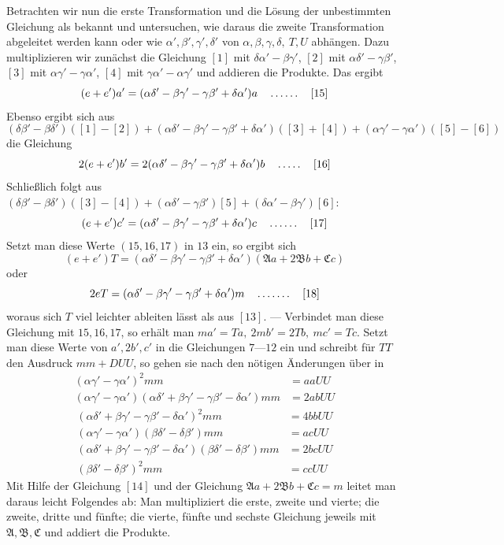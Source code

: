 Betrachten wir nun die erste Transformation und die Lösung der unbestimmten Gleichung als bekannt und untersuchen, wie daraus die zweite Transformation abgeleitet werden kann oder wie $\alpha',\beta',\gamma',\delta'$ von $\alpha,\beta,\gamma,\delta,\ T,U$ abhängen. Dazu multiplizieren wir zunächst die Gleichung $[1]$ mit $\delta\alpha'-\beta\gamma'$, $[2]$ mit $\alpha\delta'-\gamma\beta'$, $[3]$ mit $\alpha\gamma'-\gamma\alpha'$, $[4]$ mit $\gamma\alpha'-\alpha\gamma'$ und addieren die Produkte. Das ergibt
\[
(e+e')a'=(\alpha\delta'-\beta\gamma'-\gamma\beta'+\delta\alpha')a\quad\mathinner{.\,.\,.\,.\,.\,.}\quad[15]
\]
Ebenso ergibt sich aus
\[
(\delta\beta'-\beta\delta')([1]-[2])+(\alpha\delta'-\beta\gamma'-\gamma\beta'+\delta\alpha')([3]+[4])+(\alpha\gamma'-\gamma\alpha')([5]-[6])
\]
die Gleichung
\[
2(e+e')b'=2(\alpha\delta'-\beta\gamma'-\gamma\beta'+\delta\alpha')b\quad\mathinner{.\,.\,.\,.\,.}\quad[16]
\]
Schließlich folgt aus $(\delta\beta'-\beta\delta')([3]-[4])+(\alpha\delta'-\gamma\beta')[5]+(\delta\alpha'-\beta\gamma')[6]$:
\[
(e+e')c'=(\alpha\delta'-\beta\gamma'-\gamma\beta'+\delta\alpha')c\quad\mathinner{.\,.\,.\,.\,.\,.}\quad[17]
\]
Setzt man diese Werte $(15,16,17)$ in $13$ ein, so ergibt sich
\[
(e+e')T=(\alpha\delta'-\beta\gamma'-\gamma\beta'+\delta\alpha')(\mathfrak{A}a+2\mathfrak{B}b+\mathfrak{C}c)
\]
oder
\[
2eT=(\alpha\delta'-\beta\gamma'-\gamma\beta'+\delta\alpha')m\quad\mathinner{.\,.\,.\,.\,.\,.\,.}\quad[18]
\]
woraus sich $T$ viel leichter ableiten lässt als aus $[13]$. --- Verbindet man diese Gleichung mit $15,16,17$, so erhält man $ma'=Ta,\ 2mb'=2Tb,\ mc'=Tc$. Setzt man diese Werte von $a',2b',c'$ in die Gleichungen $7\text{---}12$ ein und schreibt für $TT$ den Ausdruck $mm+DUU$, so gehen sie nach den nötigen Änderungen über in
\[
\begin{aligned}
(\alpha\gamma'-\gamma\alpha')^2mm&=aaUU\\
(\alpha\gamma'-\gamma\alpha')(\alpha\delta'+\beta\gamma'-\gamma\beta'-\delta\alpha')mm&=2abUU
\end{aligned}
\]
\[
\begin{aligned}
(\alpha\delta'+\beta\gamma'-\gamma\beta'-\delta\alpha')^2mm&=4bbUU\\
(\alpha\gamma'-\gamma\alpha')(\beta\delta'-\delta\beta')mm&=acUU\\
(\alpha\delta'+\beta\gamma'-\gamma\beta'-\delta\alpha')(\beta\delta'-\delta\beta')mm&=2bcUU\\
(\beta\delta'-\delta\beta')^2mm&=ccUU
\end{aligned}
\]
Mit Hilfe der Gleichung $[14]$ und der Gleichung $\mathfrak{A}a+2\mathfrak{B}b+\mathfrak{C}c=m$ leitet man daraus leicht Folgendes ab: Man multipliziert die erste, zweite und vierte; die zweite, dritte und fünfte; die vierte, fünfte und sechste Gleichung jeweils mit $\mathfrak{A},\mathfrak{B},\mathfrak{C}$ und addiert die Produkte.
